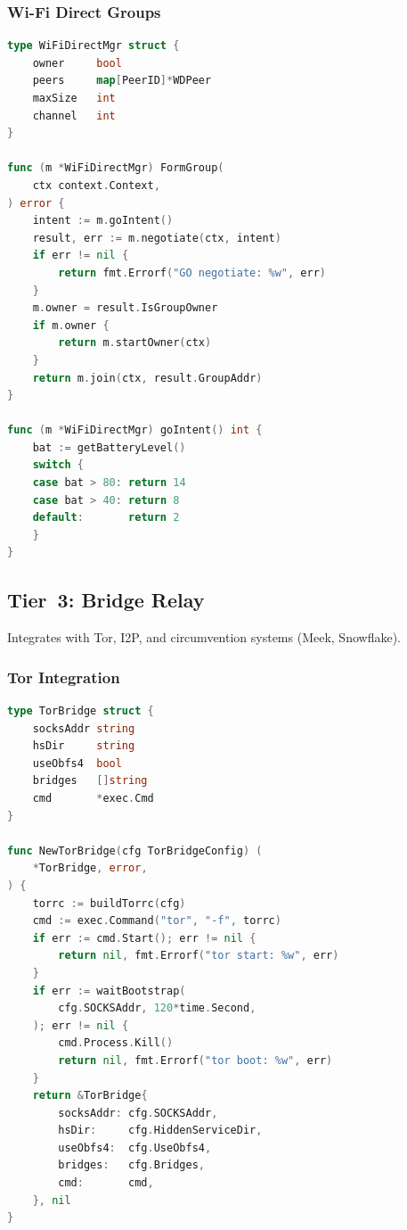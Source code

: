 \documentclass[11pt,a4paper]{article}
\begin{document}
\subsubsection{Wi-Fi Direct Groups}

\begin{lstlisting}[language=Go,caption={Wi-Fi Direct Group Management}]
type WiFiDirectMgr struct {
    owner     bool
    peers     map[PeerID]*WDPeer
    maxSize   int
    channel   int
}

func (m *WiFiDirectMgr) FormGroup(
    ctx context.Context,
) error {
    intent := m.goIntent()
    result, err := m.negotiate(ctx, intent)
    if err != nil {
        return fmt.Errorf("GO negotiate: %w", err)
    }
    m.owner = result.IsGroupOwner
    if m.owner {
        return m.startOwner(ctx)
    }
    return m.join(ctx, result.GroupAddr)
}

func (m *WiFiDirectMgr) goIntent() int {
    bat := getBatteryLevel()
    switch {
    case bat > 80: return 14
    case bat > 40: return 8
    default:       return 2
    }
}
\end{lstlisting}

\subsection{Tier~3: Bridge Relay}

Integrates with Tor, I2P, and circumvention systems (Meek, Snowflake).

\subsubsection{Tor Integration}

\begin{lstlisting}[language=Go,caption={Tor Hidden Service Setup}]
type TorBridge struct {
    socksAddr string
    hsDir     string
    useObfs4  bool
    bridges   []string
    cmd       *exec.Cmd
}

func NewTorBridge(cfg TorBridgeConfig) (
    *TorBridge, error,
) {
    torrc := buildTorrc(cfg)
    cmd := exec.Command("tor", "-f", torrc)
    if err := cmd.Start(); err != nil {
        return nil, fmt.Errorf("tor start: %w", err)
    }
    if err := waitBootstrap(
        cfg.SOCKSAddr, 120*time.Second,
    ); err != nil {
        cmd.Process.Kill()
        return nil, fmt.Errorf("tor boot: %w", err)
    }
    return &TorBridge{
        socksAddr: cfg.SOCKSAddr,
        hsDir:     cfg.HiddenServiceDir,
        useObfs4:  cfg.UseObfs4,
        bridges:   cfg.Bridges,
        cmd:       cmd,
    }, nil
}
\end{lstlisting}
\end{document}
